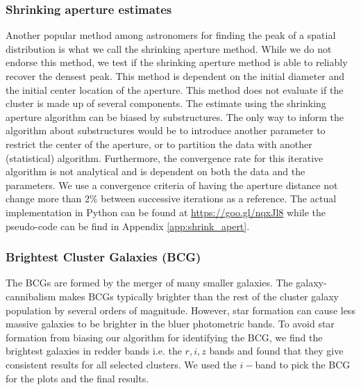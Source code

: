 \subsubsection{Shrinking aperture estimates}

Another popular method among astronomers for finding the peak of a spatial
distribution is what we call the shrinking aperture method.
While we do not endorse this method,
we test if the shrinking aperture method is able to reliably recover the 
densest peak.
This method is dependent on the initial diameter and the initial center 
location of the aperture.
This method does not evaluate if the cluster is made up of
several components.
The estimate using the shrinking aperture algorithm can be biased by
substructures. The only way to inform the algorithm about substructures would
be to introduce another parameter to restrict the center of the aperture, or to
partition the data with another (statistical) algorithm.
Furthermore, the convergence rate for this iterative algorithm is not
analytical and is dependent on both the data and the parameters. We use a
convergence criteria of having the aperture distance not change more than 2\% 
between successive iterations as a reference. The actual implementation in
Python can be found at \href{https://goo.gl/nqxJl8}{https://goo.gl/nqxJl8} while
the pseudo-code can be find in Appendix \ref{app:shrink_apert}.

\subsubsection{Brightest Cluster Galaxies (BCG)}
The BCGs are formed by the merger of many smaller
galaxies. The galaxy-cannibalism makes BCGs typically brighter than the rest of 
the cluster galaxy population by several orders of magnitude. 
However, star formation can cause
less massive galaxies to be brighter in the bluer photometric bands.
To avoid star formation from biasing our algorithm for identifying the
BCG, we find the brightest galaxies in redder bands i.e. the $r, i, z$
bands and found that they give consistent results for all selected clusters. 
We used the $i-$band to pick the BCG for the plots and the final results. 

